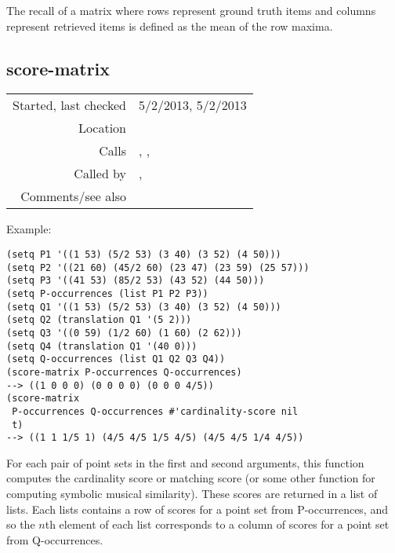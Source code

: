 \noindent The recall of a matrix where rows represent
ground truth items and columns represent retrieved
items is defined as the mean of the row maxima.


\subsection*{score-matrix}\label{fun:score-matrix}

\vspace{0.3cm}
\begin{tabular}{r|p{8cm}}
Started, last checked & 5/2/2013, 5/2/2013 \\
Location & \nameref{sec:robust-metrics} \\
Calls & \nameref{fun:cardinality-score}, \nameref{fun:equalp-score},\newline \nameref{fun:matching-score} \\
Called by & \nameref{fun:establishment-metric},\newline \nameref{fun:occurrence-matrixnrel-idx} \\
Comments/see also &
\end{tabular}

\vspace{0.5cm}
\noindent Example:
\begin{verbatim}
(setq P1 '((1 53) (5/2 53) (3 40) (3 52) (4 50)))
(setq P2 '((21 60) (45/2 60) (23 47) (23 59) (25 57)))
(setq P3 '((41 53) (85/2 53) (43 52) (44 50)))
(setq P-occurrences (list P1 P2 P3))
(setq Q1 '((1 53) (5/2 53) (3 40) (3 52) (4 50)))
(setq Q2 (translation Q1 '(5 2)))
(setq Q3 '((0 59) (1/2 60) (1 60) (2 62)))
(setq Q4 (translation Q1 '(40 0)))
(setq Q-occurrences (list Q1 Q2 Q3 Q4))
(score-matrix P-occurrences Q-occurrences)
--> ((1 0 0 0) (0 0 0 0) (0 0 0 4/5))
(score-matrix
 P-occurrences Q-occurrences #'cardinality-score nil
 t)
--> ((1 1 1/5 1) (4/5 4/5 1/5 4/5) (4/5 4/5 1/4 4/5))
\end{verbatim}

\noindent For each pair of point sets in the first and
second arguments, this function computes the
cardinality score or matching score (or some other
function for computing symbolic musical similarity).
These scores are returned in a list of lists. Each
lists contains a row of scores for a point set from
P-occurrences, and so the $n$th element of each list
corresponds to a column of scores for a point set from
Q-occurrences.
















